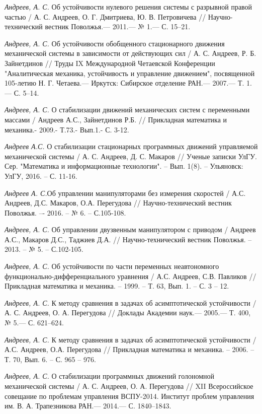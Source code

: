 \begin{thebibliography}{10}
	{\it Андреев, А. С.} Об устойчивости нулевого решения системы с разрывной правой частью /
	А. С. Андреев, О. Г. Дмитриева, Ю. В. Петровичева // Научно-технический вестник Поволжья.— 2011.— № 1.—
	С. 15–21.

	{\it Андреев, А. С.} Об устойчивости обобщенного стационарного движения механической системы в зависимости от действующих сил /
	А. С. Андреев, Р. Б. Зайнетдинов // Труды IX Международной Четаевской Конференции "Аналитическая механика, устойчивость и управление движением", 	посвященной 105-летию Н. Г. Четаева.— Иркутск: Сибирское отделение РАН.— 2007.— Т. 1.— С. 5–14.

	{\it Андреев, А. С.}  О стабилизации движений механических систем с
	переменными массами / Андреев А.С., Зайнетдинов Р.Б. //  Прикладная математика и механика.- 2009.- Т.73.- Вып.1.- С. 3-12.

	{\it Андреев А.С.} О стабилизации стационарных программных движений управляемой механической системы / А. С. Андреев, Д. С.  Макаров // Ученые записки УлГУ. Сер. "Математика и информационные технологии". -- Вып. 1(8). -- Ульяновск: УлГУ, 2016. -- С. 11-16.

	{\it Андреев А. С.}Об управлении манипуляторами без измерения скоростей / А.С. Андреев, Д.С. Макаров, О.А. Перегудова // Научно-технический 		вестник Поволжья. –- 2016. – № 6. – С.105-108. 

	{\it Андреев, А. С.} Об управлении двузвенным манипулятором с приводом / Андреев А.С., Макаров Д.С., Таджиев Д.А. // Научно-технический вестник 	Поволжья. – 2013. – № 5. – С.102-105.

	{\it Андреев, А. С.} Об устойчивости по части переменных неавтономного функционально-дифференциального уравнения / А.С. Андреев, С.В. 			Павликов // Прикладная математика и механика. – 1999. – Т. 63, Вып. 1. – С. 3 – 12.
	
	{\it Андреев, А. С.} К методу сравнения в задачах об асимптотической устойчивости /
	А. С. Андреев, О. А. Перегудова // Доклады Академии наук.— 2005.— Т. 400, № 5.—
	С. 621–624.
	
	{\it Андреев, А. С.} К методу сравнения в задачах об асимптотической устойчивости / А.С. Андреев, О.А. Перегудова // Прикладная математика и 		механика. – 2006. – Т. 70, Вып. 	6. – С. 965 – 976.

	{\it Андреев, А. С.} О стабилизации программных движений голономной механической системы /
	А. С. Андреев, О. А. Перегудова // XII Всероссийское совещание по проблемам управления ВСПУ-2014. Институт проблем управления им. В. А. 			Трапезникова РАН.— 2014.— С. 1840–1843.


\end{thebibliography}
